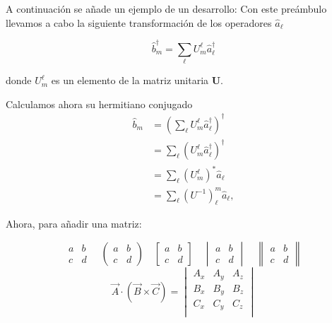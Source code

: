 \documentclass[a4paper]{article}
\begin{document}
	A continuación se añade un ejemplo de un desarrollo:
	Con este preámbulo llevamos a cabo la siguiente transformación de los operadores $\hat{a}_{\ell}$
	
	\begin{equation}
		\hat{b}_{m}^{\dagger}=\sum_{\ell}U_{m}^{\ell}\hat{a}_{\ell}^{\dagger}
	\end{equation}
	
	donde $U_{m}^{\ell}$ es un elemento de la matriz unitaria $\mathbf{U}$.
	
	Calculamos ahora su hermitiano conjugado
	\begin{align}
		\hat{b}_{m} & =\left(\sum_{\ell}U_{m}^{\ell}\hat{a}_{\ell}^{\dagger}\right)^{\dagger}\label{eq:bm}\\
		& =\sum_{\ell}\left(U_{m}^{\ell}\hat{a}_{\ell}^{\dagger}\right)^{\dagger}\nonumber \\
		& =\sum_{\ell}\left(U_{m}^{\ell}\right)^{*}\hat{a}_{\ell}\nonumber \\
		& =\sum_{\ell}\left(U^{-1}\right)_{\ell}^{m}\hat{a}_{\ell},\label{eq:bSubM}
	\end{align}
	
	Ahora, para añadir una matriz:
	
	$$
	\begin{matrix} 
		a & b \\
		c & d 
	\end{matrix}
	\quad
	\begin{pmatrix} 
		a & b \\
		c & d 
	\end{pmatrix}
	\quad
	\begin{bmatrix} 
		a & b \\
		c & d 
	\end{bmatrix}
	\quad
	\begin{vmatrix} 
		a & b \\
		c & d 
	\end{vmatrix}
	\quad
	\begin{Vmatrix} 
		a & b \\
		c & d 
	\end{Vmatrix}
	$$
	\begin{equation}
		\vec{A}\cdot(\vec{B}\times\vec{C})=\begin{vmatrix}
			A_x&A_y&A_z\\
			B_x&B_y&B_z\\
			C_x&C_y&C_z\\
		\end{vmatrix}
	\end{equation}
	
\end{document}
